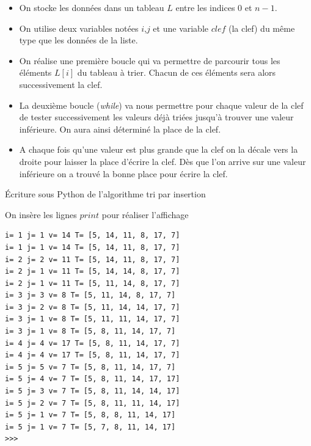 \begin{itemize}
\item On stocke les données dans un tableau $L$ entre les indices $0$ et $n-1$.
\item On utilise deux variables notées $i$,$j$ et une variable $clef$ (la clef) du même type que les données de la liste.
\item On réalise une première boucle qui va permettre de parcourir tous les éléments $L[i]$ du tableau à trier.
Chacun de ces éléments sera alors successivement la clef.
\item La deuxième boucle (\textit{while}) va nous permettre pour chaque valeur de la clef de tester successivement les valeurs déjà triées jusqu'à trouver une valeur inférieure. On aura ainsi déterminé la place de la clef.
\item A chaque fois qu'une valeur est plus grande que la clef on la décale vers la droite pour laisser la place d'écrire la clef.
Dès que l'on arrive sur une valeur inférieure on a trouvé la bonne place pour écrire la clef.
\end{itemize}


\begin{algorithme}{Écriture sous Python de l'algorithme tri par insertion}

\begin{center}
		
\end{center}

\end{algorithme}

\begin{exemple2}



On insère les lignes $print$ pour réaliser l'affichage


	\begin{DDbox}{\linewidth}
		\begin{verbatim}
i= 1 j= 1 v= 14 T= [5, 14, 11, 8, 17, 7]
i= 1 j= 1 v= 14 T= [5, 14, 11, 8, 17, 7]
i= 2 j= 2 v= 11 T= [5, 14, 11, 8, 17, 7]
i= 2 j= 1 v= 11 T= [5, 14, 14, 8, 17, 7]
i= 2 j= 1 v= 11 T= [5, 11, 14, 8, 17, 7]
i= 3 j= 3 v= 8 T= [5, 11, 14, 8, 17, 7]
i= 3 j= 2 v= 8 T= [5, 11, 14, 14, 17, 7]
i= 3 j= 1 v= 8 T= [5, 11, 11, 14, 17, 7]
i= 3 j= 1 v= 8 T= [5, 8, 11, 14, 17, 7]
i= 4 j= 4 v= 17 T= [5, 8, 11, 14, 17, 7]
i= 4 j= 4 v= 17 T= [5, 8, 11, 14, 17, 7]
i= 5 j= 5 v= 7 T= [5, 8, 11, 14, 17, 7]
i= 5 j= 4 v= 7 T= [5, 8, 11, 14, 17, 17]
i= 5 j= 3 v= 7 T= [5, 8, 11, 14, 14, 17]
i= 5 j= 2 v= 7 T= [5, 8, 11, 11, 14, 17]
i= 5 j= 1 v= 7 T= [5, 8, 8, 11, 14, 17]
i= 5 j= 1 v= 7 T= [5, 7, 8, 11, 14, 17]
>>> 
		\end{verbatim}
	\end{DDbox}



\end{exemple2}


